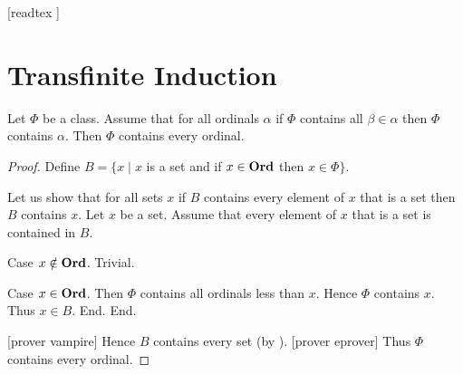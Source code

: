 \documentclass[10pt]{article}
\begin{document}
  \begin{imports}
    \begin{forthel}
      [readtex ]
    \end{forthel}
  \end{imports}


  \section*{Transfinite Induction}

  \begin{forthel}
    \begin{theorem}[id=SET_THEORY_02_8493935460614144,printid]
      Let $\Phi$ be a class.
      Assume that for all ordinals $\alpha$ if $\Phi$ contains all $\beta \in \alpha$ then $\Phi$ contains $\alpha$.
      Then $\Phi$ contains every ordinal.
    \end{theorem}
    \begin{proof}
      Define $B = \{ x \mid x$ is a set and if $x \in \textbf{Ord}$ then $x \in \Phi \}$.

      Let us show that for all sets $x$ if $B$ contains every element of $x$ that is a set then $B$ contains $x$.
        Let $x$ be a set.
        Assume that every element of $x$ that is a set is contained in $B$.

        Case $x \notin \textbf{Ord}$. Trivial.

        Case $x \in \textbf{Ord}$.
          Then $\Phi$ contains all ordinals less than $x$.
          Hence $\Phi$ contains $x$.
          Thus $x \in B$.
        End.
      End.

      [prover vampire]
      Hence $B$ contains every set (by ).
      [prover eprover]
      Thus $\Phi$ contains every ordinal.
    \end{proof}
  \end{forthel}
\end{document}
